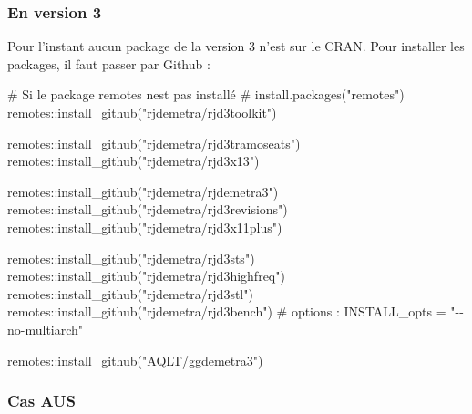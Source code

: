 \documentclass[
]{article}
\newenvironment{Shaded}{\begin{snugshade}}{\end{snugshade}}
\newcommand{\CommentTok}[1]{\textcolor[rgb]{0.37,0.37,0.37}{#1}}
\newcommand{\FunctionTok}[1]{\textcolor[rgb]{0.28,0.35,0.67}{#1}}
\newcommand{\NormalTok}[1]{\textcolor[rgb]{0.00,0.46,0.62}{#1}}
\newcommand{\SpecialCharTok}[1]{\textcolor[rgb]{0.37,0.37,0.37}{#1}}
\newcommand{\StringTok}[1]{\textcolor[rgb]{0.13,0.47,0.30}{#1}}
\begin{document}
\hypertarget{en-version-3}{%
\subsubsection{En version 3}\label{en-version-3}}

Pour l'instant aucun package de la version 3 n'est sur le CRAN. Pour
installer les packages, il faut passer par Github :

\begin{Shaded}
\begin{Highlighting}[]
\CommentTok{\# Si le package remotes n\textquotesingle{}est pas installé}
\CommentTok{\# install.packages("remotes")}
\NormalTok{remotes}\SpecialCharTok{::}\FunctionTok{install\_github}\NormalTok{(}\StringTok{"rjdemetra/rjd3toolkit"}\NormalTok{)}

\NormalTok{remotes}\SpecialCharTok{::}\FunctionTok{install\_github}\NormalTok{(}\StringTok{"rjdemetra/rjd3tramoseats"}\NormalTok{)}
\NormalTok{remotes}\SpecialCharTok{::}\FunctionTok{install\_github}\NormalTok{(}\StringTok{"rjdemetra/rjd3x13"}\NormalTok{)}

\NormalTok{remotes}\SpecialCharTok{::}\FunctionTok{install\_github}\NormalTok{(}\StringTok{"rjdemetra/rjdemetra3"}\NormalTok{)}
\NormalTok{remotes}\SpecialCharTok{::}\FunctionTok{install\_github}\NormalTok{(}\StringTok{"rjdemetra/rjd3revisions"}\NormalTok{)}
\NormalTok{remotes}\SpecialCharTok{::}\FunctionTok{install\_github}\NormalTok{(}\StringTok{"rjdemetra/rjd3x11plus"}\NormalTok{)}

\NormalTok{remotes}\SpecialCharTok{::}\FunctionTok{install\_github}\NormalTok{(}\StringTok{"rjdemetra/rjd3sts"}\NormalTok{)}
\NormalTok{remotes}\SpecialCharTok{::}\FunctionTok{install\_github}\NormalTok{(}\StringTok{"rjdemetra/rjd3highfreq"}\NormalTok{)}
\NormalTok{remotes}\SpecialCharTok{::}\FunctionTok{install\_github}\NormalTok{(}\StringTok{"rjdemetra/rjd3stl"}\NormalTok{)}
\NormalTok{remotes}\SpecialCharTok{::}\FunctionTok{install\_github}\NormalTok{(}\StringTok{"rjdemetra/rjd3bench"}\NormalTok{)}
\CommentTok{\# options : INSTALL\_opts = "{-}{-}no{-}multiarch"}

\NormalTok{remotes}\SpecialCharTok{::}\FunctionTok{install\_github}\NormalTok{(}\StringTok{"AQLT/ggdemetra3"}\NormalTok{)}
\end{Highlighting}
\end{Shaded}

\hypertarget{cas-aus}{%
\subsubsection{Cas AUS}\label{cas-aus}}
\end{document}
